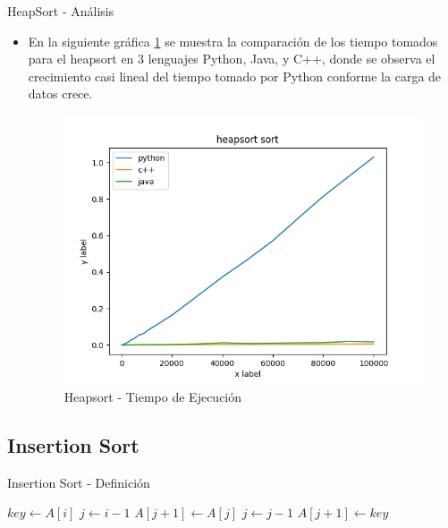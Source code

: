 \documentclass[11pt]{beamer}
\begin{document}
    		\begin{frame}{HeapSort - Análisis}
    		     \begin{itemize}
    		         \item En la siguiente gráfica \ref{fig:heapsort_diagram} se muestra la comparación de los tiempo tomados para el heapsort en 3 lenguajes Python, Java, y C++, donde se observa el crecimiento casi lineal del tiempo tomado por Python conforme la carga de datos crece.
                            
                    \begin{figure}[H]
                        \centering \includegraphics[scale=0.4]{img/heapsort_diagram.png}
                        \caption{Heapsort - Tiempo de Ejecución}
                        \label{fig:heapsort_diagram}
                    \end{figure}
    		     \end{itemize}
    		\end{frame}
		\subsection{Insertion Sort}
		
		    \begin{frame}{Insertion Sort - Definición}
    		    \begin{algorithm}[H]
                    \begin{algorithmic}[1]
                            \STATE $key \gets A[i]$
                            \STATE $j \gets i-1$
                                \STATE $A[j + 1] \gets A[j]$ 
                                \STATE $j \gets j - 1$
                            \ENDWHILE
                            \STATE $A[j + 1] \gets key$
                        \ENDFOR
                    \end{algorithmic}
                    \caption{INSERTION-SORT(A)}
                    \label{alg:insertion-sort}
                \end{algorithm}
    		\end{frame}
    		
\end{document}
